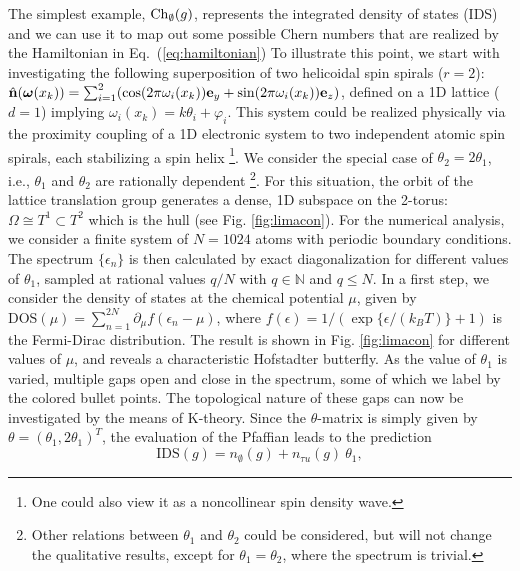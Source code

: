 \documentclass[
    10pt,
    aps,
    prl,
    twocolumn,
    floatfix,
    superscriptaddress
]{revtex4-2}
\begin{document}
The simplest example, ${\rm Ch}_{\emptyset} (g)$, represents the integrated density of states (IDS) and we can use it to map out some possible Chern numbers that are realized by the Hamiltonian in Eq.~(\ref{eq:hamiltonian})
To illustrate this point, we start with investigating the following superposition of two helicoidal spin spirals ($r=2$):
$\hat{\mathbf{n}}( \boldsymbol{\omega}(x_k ) )
=\sum_{i=1}^{2}( \cos ( 2 \pi \omega_i(x_k) )\mathbf{e}_y
+\sin ( 2 \pi \omega_i(x_k) )\mathbf{e}_z)
$,
defined on a 1D lattice ($d=1$) implying $\omega_i(x_k) = k \theta_i + \varphi_i$. 
This system could be realized physically via the proximity coupling of a 1D electronic system to two independent atomic spin spirals, each stabilizing a spin helix \footnote{One could also view it as a noncollinear spin density wave.}.
We consider the special case of $\theta_2 = 2 \theta_1$, i.e., $\theta_1$ and $\theta_2$ are rationally dependent \footnote{Other relations between $\theta_1$ and $\theta_2$ could be considered, but will not change the qualitative results, except for $\theta_1=\theta_2$, where the spectrum is trivial.}.
For this situation, the orbit of the lattice translation group generates a dense, 1D subspace on the 2-torus:  $\Omega \cong T^1 \subset T^2$ which is the hull (see Fig. \ref{fig:limacon}).
For the numerical analysis, we consider a finite system of $N=1024$ atoms with periodic boundary conditions. 
The spectrum $\lbrace \epsilon_n \rbrace$ is then calculated by exact diagonalization for different values of $\theta_1$, sampled at rational values $q/N$ with $q\in \mathbb{N}$ and $q \leq N$.
In a first step, we consider the density of states at the chemical potential $\mu$, given by
$\mathrm{DOS}(\mu) = \sum_{n=1}^{2N} \partial_\mu f( \epsilon_n - \mu)$, where $f(\epsilon) = 1/ ( \exp\lbrace \epsilon / (k_B T) \rbrace + 1 ) $ is the Fermi-Dirac distribution.
The result is shown in Fig. \ref{fig:limacon} for different values of $\mu$, and reveals a characteristic Hofstadter butterfly.
As the value of $\theta_1$ is varied, multiple gaps open and close in the spectrum, some of which we label by the colored bullet points.
The topological nature of these gaps can now be investigated by the means of K-theory.
Since the $\theta$-matrix is simply given by $\theta = (\theta_1, 2\theta_1)^T$, the evaluation of the Pfaffian leads to the prediction
\begin{equation}
    \mathrm{IDS}(g) = n_\emptyset(g) + n_{\tau u}(g)~\theta_1 ,
    \label{eq:k_prediction}
\end{equation}
\end{document}
